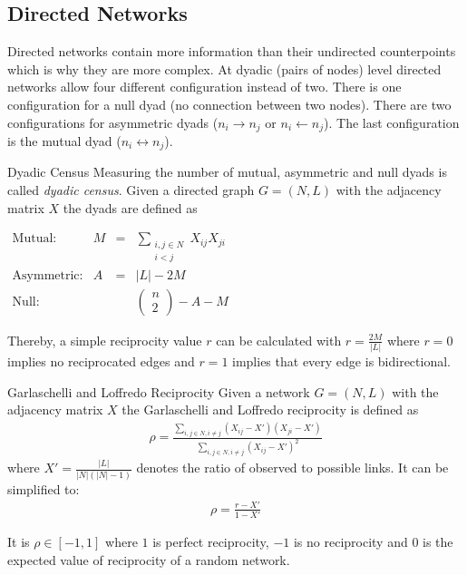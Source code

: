 \documentclass[english]{panikzettel}
\begin{document}
\subsection{Directed Networks}
Directed networks contain more information than their undirected counterpoints which is why they are more complex.
At dyadic (pairs of nodes) level directed networks allow four different configuration instead of two.
There is one configuration for a null dyad (no connection between two nodes). 
There are two configurations for asymmetric dyads ($ n_i \rightarrow n_j $ or $ n_i \leftarrow n_j $).
The last configuration is the mutual dyad ($ n_i \leftrightarrow n_j $).

\begin{defi}{Dyadic Census}
Measuring the number of mutual, asymmetric and null dyads is called \textit{dyadic census}. 
Given a directed graph $ G = (N,L) $ with the adjacency matrix $ X $ the dyads are defined as

$ \begin{array}{lrcl}
\text{Mutual:} & M & = & \sum\limits_{\substack{i,j \in N\\ i < j}} X_{ij} X_{ji} \\
\text{Asymmetric:} & A & = & |L| - 2 M \\
\text{Null:} &&& \left(\begin{array}{c}
n \\ 2
\end{array}\right) - A - M
\end{array} $
\end{defi}

Thereby, a simple reciprocity value $ r $ can be calculated with $ r = \frac{2M}{|L|} $ where $ r = 0 $ implies no reciprocated edges and $ r = 1 $ implies that every edge is bidirectional.

\begin{defi}{Garlaschelli and Loffredo Reciprocity}
Given a network $ G = (N,L) $ with the adjacency matrix $ X $ the Garlaschelli and Loffredo reciprocity is defined as
\begin{align*}
	\rho = \frac{\sum\limits_{i,j \in N, i \neq j} (X_{ij} - X') (X_{ji} - X')}{\sum\limits_{i,j \in N, i \neq j} (X_{ij} - X')^2}
\end{align*}
where $ X' = \frac{|L|}{|N| (|N| - 1)} $ denotes the ratio of observed to possible links.
It can be simplified to:
\begin{align*}
	\rho = \frac{r - X'}{1 - X'}
\end{align*}

It is $ \rho \in [-1,1] $ where $ 1 $ is perfect reciprocity, $ -1 $ is no reciprocity and $ 0 $ is the expected value of reciprocity of a random network.
\end{defi}
\end{document}
